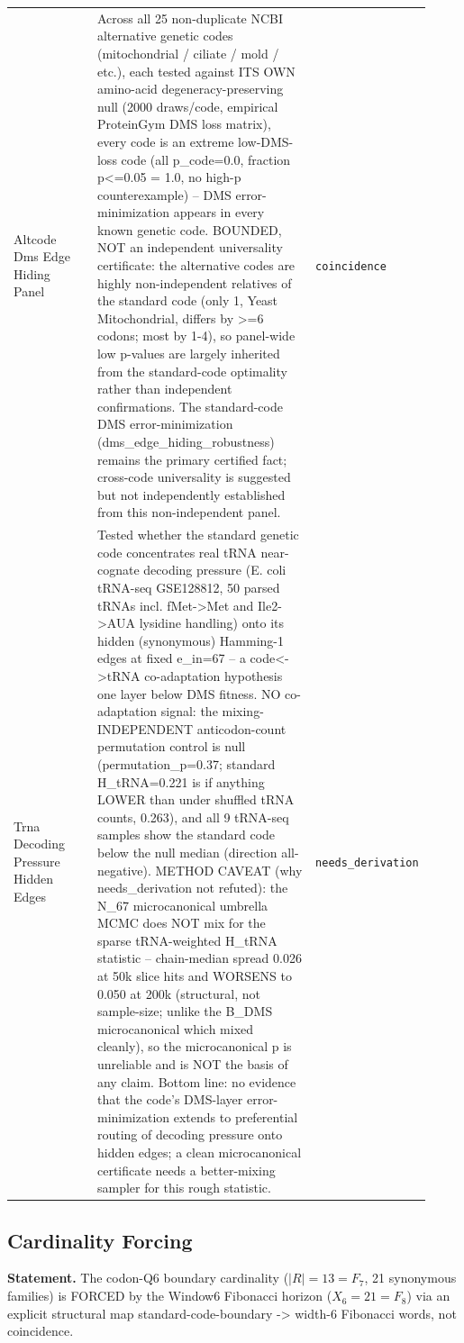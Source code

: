 \begin{longtable}{>{\raggedright\arraybackslash}p{0.22\linewidth}>{\raggedright\arraybackslash}p{0.55\linewidth}>{\raggedright\arraybackslash}p{0.15\linewidth}}
Altcode Dms Edge Hiding Panel & Across all 25 non-duplicate NCBI alternative genetic codes (mitochondrial / ciliate / mold / etc.), each tested against ITS OWN amino-acid degeneracy-preserving null (2000 draws/code, empirical ProteinGym DMS loss matrix), every code is an extreme low-DMS-loss code (all p\_code=0.0, fraction p<=0.05 = 1.0, no high-p counterexample) -- DMS error-minimization appears in every known genetic code. BOUNDED, NOT an independent universality certificate: the alternative codes are highly non-independent relatives of the standard code (only 1, Yeast Mitochondrial, differs by >=6 codons; most by 1-4), so panel-wide low p-values are largely inherited from the standard-code optimality rather than independent confirmations. The standard-code DMS error-minimization (dms\_edge\_hiding\_robustness) remains the primary certified fact; cross-code universality is suggested but not independently established from this non-independent panel. & \texttt{coincidence} \\
Trna Decoding Pressure Hidden Edges & Tested whether the standard genetic code concentrates real tRNA near-cognate decoding pressure (E. coli tRNA-seq GSE128812, 50 parsed tRNAs incl. fMet->Met and Ile2->AUA lysidine handling) onto its hidden (synonymous) Hamming-1 edges at fixed e\_in=67 -- a code<->tRNA co-adaptation hypothesis one layer below DMS fitness. NO co-adaptation signal: the mixing-INDEPENDENT anticodon-count permutation control is null (permutation\_p=0.37; standard H\_tRNA=0.221 is if anything LOWER than under shuffled tRNA counts, 0.263), and all 9 tRNA-seq samples show the standard code below the null median (direction all-negative). METHOD CAVEAT (why needs\_derivation not refuted): the N\_67 microcanonical umbrella MCMC does NOT mix for the sparse tRNA-weighted H\_tRNA statistic -- chain-median spread 0.026 at 50k slice hits and WORSENS to 0.050 at 200k (structural, not sample-size; unlike the B\_DMS microcanonical which mixed cleanly), so the microcanonical p is unreliable and is NOT the basis of any claim. Bottom line: no evidence that the code's DMS-layer error-minimization extends to preferential routing of decoding pressure onto hidden edges; a clean microcanonical certificate needs a better-mixing sampler for this rough statistic. & \texttt{needs\_derivation} \\
\end{longtable}

\subsection{Cardinality Forcing}\label{sec:bridge-cardinality-forcing}
\textbf{Statement.} The codon-Q6 boundary cardinality ($|R|=13=F_7$, 21 synonymous families) is FORCED by the Window6
Fibonacci horizon ($X_6=21=F_8$) via an explicit structural map standard-code-boundary -> width-6
Fibonacci words, not coincidence.

